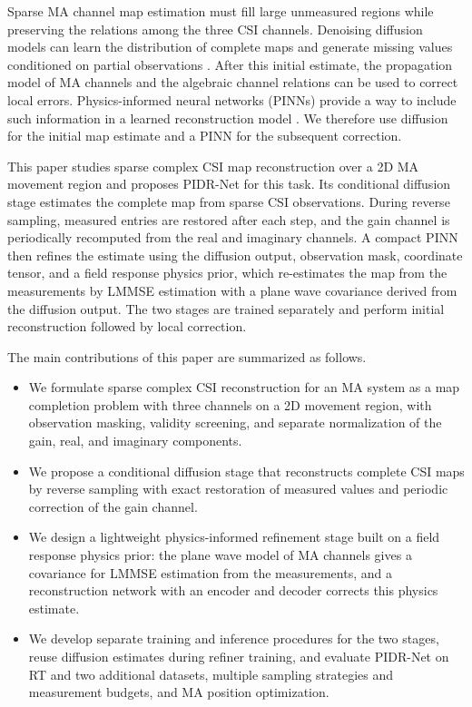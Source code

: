 \documentclass[lettersize,journal]{IEEEtran}
\begin{document}
Sparse MA channel map estimation must fill large unmeasured regions while preserving the relations among the three CSI channels. Denoising diffusion models can learn the distribution of complete maps and generate missing values conditioned on partial observations \cite{ref_ddpm}. After this initial estimate, the propagation model of MA channels and the algebraic channel relations can be used to correct local errors. Physics-informed neural networks (PINNs) provide a way to include such information in a learned reconstruction model \cite{ref_pinn}. We therefore use diffusion for the initial map estimate and a PINN for the subsequent correction.

This paper studies sparse complex CSI map reconstruction over a 2D MA movement region and proposes PIDR-Net for this task. Its conditional diffusion stage estimates the complete map from sparse CSI observations. During reverse sampling, measured entries are restored after each step, and the gain channel is periodically recomputed from the real and imaginary channels. A compact PINN then refines the estimate using the diffusion output, observation mask, coordinate tensor, and a field response physics prior, which re-estimates the map from the measurements by LMMSE estimation with a plane wave covariance derived from the diffusion output. The two stages are trained separately and perform initial reconstruction followed by local correction.

The main contributions of this paper are summarized as follows.
\begin{itemize}
    \item We formulate sparse complex CSI reconstruction for an MA system as a map completion problem with three channels on a 2D movement region, with observation masking, validity screening, and separate normalization of the gain, real, and imaginary components.
    \item We propose a conditional diffusion stage that reconstructs complete CSI maps by reverse sampling with exact restoration of measured values and periodic correction of the gain channel.
    \item We design a lightweight physics-informed refinement stage built on a field response physics prior: the plane wave model of MA channels gives a covariance for LMMSE estimation from the measurements, and a reconstruction network with an encoder and decoder corrects this physics estimate.
    \item We develop separate training and inference procedures for the two stages, reuse diffusion estimates during refiner training, and evaluate PIDR-Net on RT and two additional datasets, multiple sampling strategies and measurement budgets, and MA position optimization.
\end{itemize}
\end{document}
